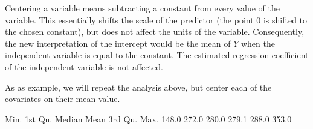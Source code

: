 \documentclass[letterpaper,10pt,english]{jupyterBook}
\begin{document}
\sphinxAtStartPar
Centering a variable means subtracting a constant from every value of the  variable. This essentially shifts the scale of the predictor (the point 0 is shifted to the chosen constant), but does not affect the units of the variable. Consequently, the new interpretation of the intercept would be the mean of \(Y\) when the independent variable is equal to the constant. The estimated regression coefficient of the independent variable is not affected.

\sphinxAtStartPar
As as example, we will repeat the analysis above, but center each of the covariates on their mean value.

\begin{sphinxVerbatim}[commandchars=\\\{\}]
 


 
\end{sphinxVerbatim}

\begin{sphinxVerbatim}[commandchars=\\\{\}]
   Min. 1st Qu.  Median    Mean 3rd Qu.    Max. 
  148.0   272.0   280.0   279.1   288.0   353.0 
\end{sphinxVerbatim}
\end{document}
